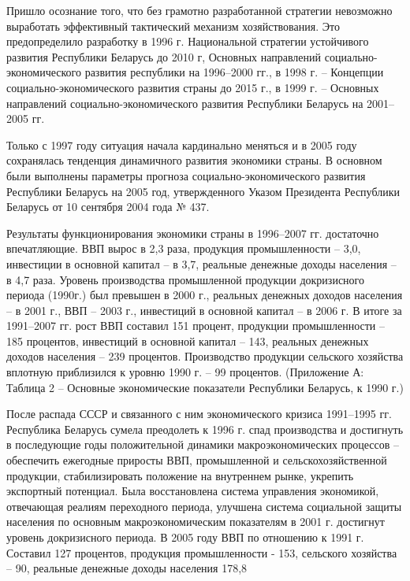 \documentclass[14pt,a4paper]{article}
\begin{document}
    Пришло осознание того, что без грамотно разработанной стратегии невозможно выработать эффективный тактический механизм хозяйствования.
    Это предопределило разработку в 1996 г. Национальной стратегии устойчивого развития Республики Беларусь до 2010 г, Основных направлений социально-экономического развития республики на 1996--2000 гг., в 1998 г. – Концепции социально-экономического развития страны до 2015 г., в 1999 г. – Основных направлений социально-экономического развития Республики Беларусь на 2001--2005 гг.
    \par
    Только с 1997 году ситуация начала кардинально меняться и в 2005 году сохранялась тенденция динамичного развития экономики страны.
    В основном были выполнены параметры прогноза социально-экономического развития Республики Беларусь на 2005 год, утвержденного Указом Президента Республики Беларусь от 10 сентября 2004 года № 437.
    \par
    Результаты функционирования экономики страны в 1996--2007 гг. достаточно впечатляющие.
    ВВП вырос в 2,3 раза, продукция промышленности – 3,0, инвестиции в основной капитал – в 3,7, реальные денежные доходы населения – в 4,7 раза.
    Уровень производства промышленной продукции докризисного периода (1990г.) был превышен в 2000 г., реальных денежных доходов населения – в 2001 г., ВВП – 2003 г., инвестиций в основной капитал – в 2006 г.
    В итоге за 1991--2007 гг. рост ВВП составил 151 процент, продукции промышленности – 185 процентов, инвестиций в основной капитал – 143, реальных денежных доходов населения – 239 процентов.
    Производство продукции сельского хозяйства вплотную приблизился к уровню 1990 г. – 99 процентов. (Приложение А: Таблица 2 – Основные экономические показатели Республики Беларусь, к 1990 г.)
    \\
    \par
    После распада СССР и связанного с ним экономического кризиса 1991--1995 гг. Республика Беларусь сумела преодолеть к 1996 г. спад производства и достигнуть в последующие годы положительной динамики макроэкономических процессов – обеспечить ежегодные приросты ВВП, промышленной и сельскохозяйственной продукции, стабилизировать положение на внутреннем рынке, укрепить экспортный потенциал.
    Была восстановлена система управления экономикой, отвечающая реалиям переходного периода, улучшена система социальной защиты населения по основным макроэкономическим показателям в 2001 г. достигнут уровень докризисного периода.
    В 2005 году ВВП по отношению к 1991 г.
    Составил 127 процентов, продукция промышленности - 153, сельского хозяйства – 90, реальные денежные доходы населения 178,8
\end{document}
